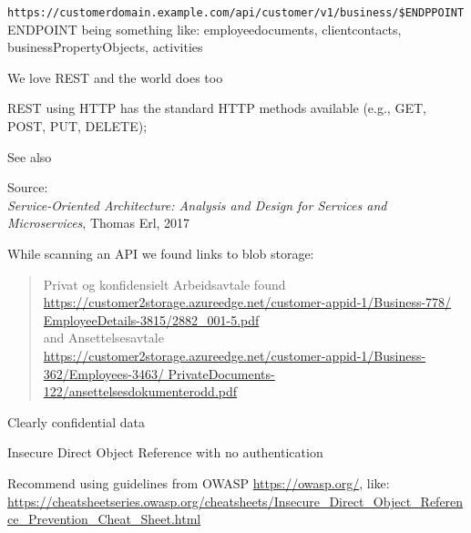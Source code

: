 \documentclass[Screen16to9,17pt]{foils}
\begin{document}

\verb+https://customerdomain.example.com/api/customer/v1/business/$ENDPPOINT+\\
ENDPOINT being something like: employeedocuments, clientcontacts, businessPropertyObjects, activities

\begin{list2}
\item    We love REST and the world does too
\end{list2}



\begin{list2}
\item REST using HTTP has the standard HTTP methods available (e.g., GET, POST, PUT, DELETE);
\item See also 
\end{list2}
Source: {\footnotesize\\
\emph{Service‑Oriented Architecture: Analysis and Design for Services and Microservices}, Thomas Erl, 2017}





While scanning an API we found links to blob storage:
\begin{quote}
    Privat og konfidensielt Arbeidsavtale found\\{\footnotesize
    \url{https://customer2storage.azureedge.net/customer-appid-1/Business-778/
EmployeeDetails-3815/2882_001-5.pdf}}\\
and Ansettelsesavtale\\ {\footnotesize\url{https://customer2storage.azureedge.net/customer-appid-1/Business-362/Employees-3463/
PrivateDocuments-122/ansettelsesdokumenterodd.pdf}}
\end{quote}
Clearly confidential data

\begin{list2}
    \item Insecure Direct Object Reference with no authentication
    \item Recommend using guidelines from OWASP \url{https://owasp.org/}, like:\\{\footnotesize
    \url{https://cheatsheetseries.owasp.org/cheatsheets/Insecure_Direct_Object_Reference_Prevention_Cheat_Sheet.html}}
\end{list2}
\end{document}
